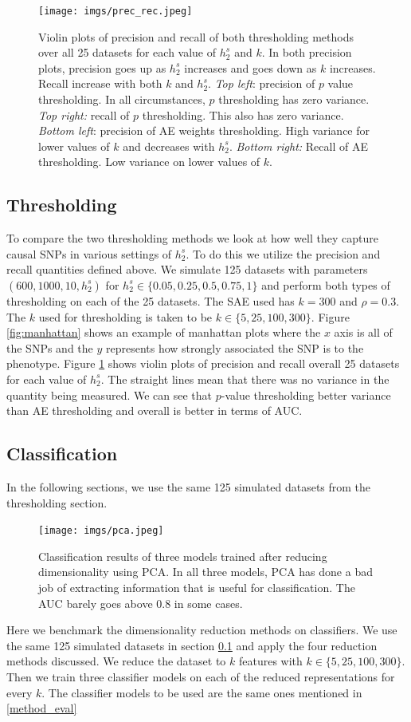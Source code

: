 \documentclass{article}
\begin{document}
\begin{figure}[t]
    \centering
    \texttt{[image: imgs/prec\_rec.jpeg]}
    \caption{Violin plots of precision and recall of both thresholding methods over all 25 datasets for each value of $h_2^s$ and $k$. In both precision plots, precision goes up as $h_2^s$ increases and goes down as $k$ increases. Recall increase with both $k$ and $h_2^s$. \emph{Top left}: precision of $p$ value thresholding. In all circumstances, $p$ thresholding has zero variance. \emph{Top right:} recall of $p$ thresholding. This also has zero variance. \emph{Bottom left}: precision of AE weights thresholding. High variance for lower values of $k$ and decreases with $h_2^s.$ \emph{Bottom right:} Recall of AE thresholding. Low variance on lower values of $k.$ }
    \label{fig:prec_rec}
\end{figure}

\subsection{Thresholding} \label{results_th}
To compare the two thresholding methods we look at how well they capture causal SNPs in various settings of $h_2^s.$ To do this we utilize the precision and recall quantities defined above. We simulate 125 datasets with parameters $(600, 1000, 10, h_2^s)$ for $h_2^s \in \{0.05, 0.25, 0.5, 0.75, 1\}$ and perform both types of thresholding on each of the 25 datasets. The SAE used has $k=300$ and $\rho=0.3.$ The $k$ used for thresholding is taken to be $k \in \{5, 25, 100, 300\}.$ Figure \ref{fig:manhattan} shows an example of manhattan plots where the $x$ axis is all of the SNPs and the $y$ represents how strongly associated the SNP is to the phenotype. Figure \ref{fig:prec_rec} shows violin plots of precision and recall overall 25 datasets for each value of $h_2^s$. The straight lines mean that there was no variance in the quantity being measured. We can see that $p$-value thresholding better variance than AE thresholding and overall is better in terms of AUC. 

\subsection{Classification}
In the following sections, we use the same 125 simulated datasets from the thresholding section.
\begin{figure}[t]
    \centering
    \texttt{[image: imgs/pca.jpeg]}
    \caption{Classification results of three models trained after reducing dimensionality using PCA. In all three models, PCA has done a bad job of extracting information that is useful for classification. The AUC barely goes above 0.8 in some cases. }
    \label{fig:pca_auc}
\end{figure}
Here we benchmark the dimensionality reduction methods on classifiers. We use the same 125 simulated datasets in section \ref{results_th} and apply the four reduction methods discussed. We reduce the dataset to $k$ features with $k \in \{5, 25, 100, 300\}$. Then we train three classifier models on each of the reduced representations for every $k.$ The classifier models to be used are the same ones mentioned in \ref{method_eval}
\end{document}
